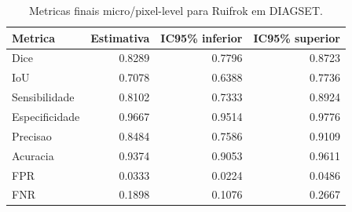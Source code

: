 \begin{table}[!htb]
\centering
\caption{Metricas finais micro/pixel-level para Ruifrok em DIAGSET.}
\label{tab:results_diagset-micro-ruifrok}
\small
\begin{tabular}{lrrr}
\toprule
Metrica & Estimativa & IC95\% inferior & IC95\% superior \\
\midrule
Dice & 0.8289 & 0.7796 & 0.8723 \\
IoU & 0.7078 & 0.6388 & 0.7736 \\
Sensibilidade & 0.8102 & 0.7333 & 0.8924 \\
Especificidade & 0.9667 & 0.9514 & 0.9776 \\
Precisao & 0.8484 & 0.7586 & 0.9109 \\
Acuracia & 0.9374 & 0.9053 & 0.9611 \\
FPR & 0.0333 & 0.0224 & 0.0486 \\
FNR & 0.1898 & 0.1076 & 0.2667 \\
\bottomrule
\end{tabular}
\end{table}
